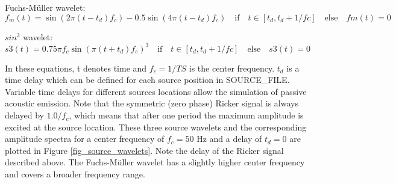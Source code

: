 \documentclass[11pt,onecolumn,oneside]{article}
\begin{document}
Fuchs-M\"uller wavelet:
\begin{equation}
f_m(t)=\sin(2\pi(t-t_d)f_c)-0.5\sin(4\pi(t-t_d)f_c) \quad \mbox{if} \quad t\in[t_d,t_d+1/fc] \quad \mbox{else} \quad fm(t)=0
\label{eq_fm}
\end{equation}

$sin^3$ wavelet:
\begin{equation}
s3(t)=0.75 \pi f_c \sin(\pi(t+t_d)f_c)^3\quad \mbox{if} \quad t \in[t_d,t_d+1/fc] \quad \mbox{else} \quad s3(t)=0
\label{eq_s3}
\end{equation}

In these equations, t denotes time and $f_c=1/TS$ is the center frequency. $t_d$ is a time delay which can be defined for each source position in SOURCE\_FILE. Variable time delays for different sources locations allow the simulation of passive acoustic emission. Note that the symmetric (zero phase) Ricker signal is always delayed by $1.0/f_c$, which means that after
one period the maximum amplitude is excited at the source location.  These three source wavelets and the corresponding amplitude spectra for a center frequency of $f_c=50$ Hz and
a delay of $t_d=0$ are plotted in Figure \ref{fig_source_wavelets}. Note the delay of the Ricker signal described above. The Fuchs-M\"uller wavelet has a slightly higher center frequency and covers a broader frequency range.
\end{document}
